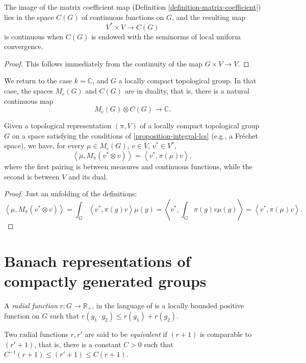 \begin{lemma}
\label{lemma-matrixcoefficient-continuous}
The image of the matrix coefficient map (Definition \ref{definition-matrix-coefficient}) lies in the space $C(G)$ of continuous functions on $G$, and the resulting map 
$$ V^* \times V \to C(G)$$
is continuous when $C(G)$ is endowed with the seminorms of local uniform convergence.
\end{lemma}

\begin{proof}
 This follows immediately from the continuity of the map $G\times V\to V$.
\end{proof}


We return to the case $k=\mathbb C$, and $G$ a locally compact topological group. In that case, the spaces $M_c(G)$ and $C(G)$ are in duality, that is, there is a natural continuous map
$$ M_c(G) \otimes C(G) \to \mathbb C.$$

\begin{lemma}
 \label{lemma-mc-dualto-operator}
Given a topological representation $(\pi, V)$ of  a locally compact topological group $G$ on a space satisfying the conditions of \ref{proposition-integral-lcs} (e.g., a Fr\'echet space), we have, for every $\mu\in M_c(G)$, $v\in V$, $v^*\in V^*$,
\begin{equation}
 \label{equation-mc-dualto-operator}
\left< \mu , M_\pi (v^*\otimes v)\right> = \left< v^*, \pi(\mu) v \right>,
\end{equation}
where the first pairing is between measures and continuous functions, while the second is between $V$ and its dual.
\end{lemma}

\begin{proof}
 Just an unfolding of the definitions:
$$\left< \mu , M_\pi (v^*\otimes v)\right> =  \int_G \left< v^*, \pi(g) v\right>  \mu(g) = \left< v^*, \int_G \pi(g) v \mu(g) \right> = \left< v^* , \pi(\mu) v\right>.$$
\end{proof}







 
 
\section{Banach representations of compactly generated groups}
\label{section-Banach-representations}

\begin{definition}
\label{definition-radial-function}
 A {\it radial function} $r: G\to \mathbb R_+$, in the language of 
 \cite{Bernstein-Plancherel}
is a locally bounded positive function on $G$ such that $r(g_1\cdot g_2) \le r(g_1) + r(g_2)$. 

Two radial functions $r, r'$ are said to be {\it equivalent} if $(r+1)$ is comparable to $(r'+1)$, that is, there is a constant $C>0$ such that $C^{-1} (r+1)\le (r'+1) \le C (r+1)$.
\end{definition}

